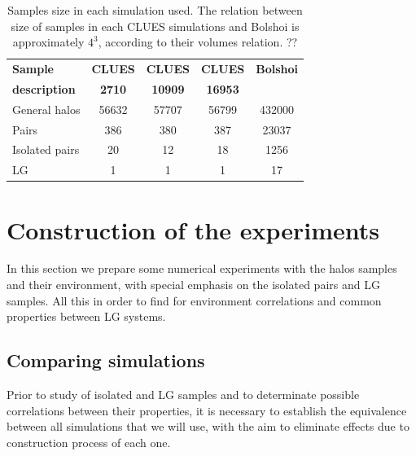 \documentclass[usenatbib]{latex/mn2e}
\begin{document}
\begin{table}
  \centering
  \begin{tabular}{l | c c c c} \hline
	\textbf{Sample}& \textbf{CLUES} & \textbf{CLUES} & \textbf{CLUES} & \textbf{Bolshoi} \\
	\textbf{description}& \textbf{2710} & \textbf{10909} & \textbf{16953} &  \\ \hline
	General halos 	& 56632 & 57707 & 56799  & 432000 	\\
	Pairs 			& 386 	& 380 	& 387	 & 23037 	\\
	Isolated pairs	& 20 	& 12 	& 18 	 & 1256 	\\
	LG 				& 1 	& 1 	& 1 	 & 17		\\ \hline
  \end{tabular}
  
  \caption{Samples size in each simulation used. The relation between size 
  of samples in each CLUES simulations and Bolshoi is approximately $4^3$, 
  according to their volumes relation. ?? }
  
  \label{Tab:Samples}
\end{table}


\section{Construction of the experiments}
\label{sec:experiments}


In this section we prepare some numerical experiments with the halos 
samples and their environment, with special emphasis on the isolated pairs 
and LG samples. All this in order to find for environment correlations and 
common properties between LG systems.


\subsection{Comparing simulations}
\label{subsec:comparison_simulations}


Prior to study of isolated and LG samples and to determinate possible 
correlations between their properties, it is necessary to establish the 
equivalence between all simulations that we will use, with the aim to 
eliminate effects due to construction process of each one.
\end{document}
